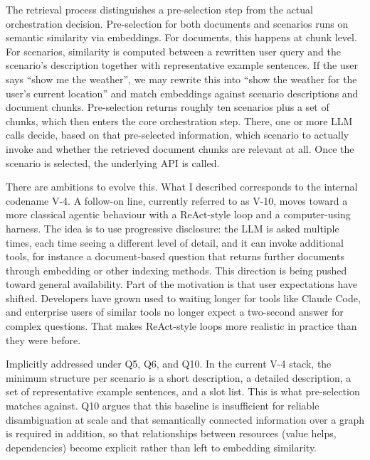 \medskip{}

The retrieval process distinguishes a pre-selection step from the actual orchestration decision. Pre-selection for both documents and scenarios runs on semantic similarity via embeddings. For documents, this happens at chunk level. For scenarios, similarity is computed between a rewritten user query and the scenario's description together with representative example sentences. If the user says ``show me the weather'', we may rewrite this into ``show the weather for the user's current location'' and match embeddings against scenario descriptions and document chunks. Pre-selection returns roughly ten scenarios plus a set of chunks, which then enters the core orchestration step. There, one or more LLM calls decide, based on that pre-selected information, which scenario to actually invoke and whether the retrieved document chunks are relevant at all. Once the scenario is selected, the underlying API is called.

There are ambitions to evolve this. What I described corresponds to the internal codename V-4. A follow-on line, currently referred to as V-10, moves toward a more classical agentic behaviour with a ReAct-style loop and a computer-using harness. The idea is to use progressive disclosure: the LLM is asked multiple times, each time seeing a different level of detail, and it can invoke additional tools, for instance a document-based question that returns further documents through embedding or other indexing methods. This direction is being pushed toward general availability. Part of the motivation is that user expectations have shifted. Developers have grown used to waiting longer for tools like Claude Code, and enterprise users of similar tools no longer expect a two-second answer for complex questions. That makes ReAct-style loops more realistic in practice than they were before.

\medskip{}

Implicitly addressed under Q5, Q6, and Q10. In the current V-4 stack, the minimum structure per scenario is a short description, a detailed description, a set of representative example sentences, and a slot list. This is what pre-selection matches against. Q10 argues that this baseline is insufficient for reliable disambiguation at scale and that semantically connected information over a graph is required in addition, so that relationships between resources (value helps, dependencies) become explicit rather than left to embedding similarity.

